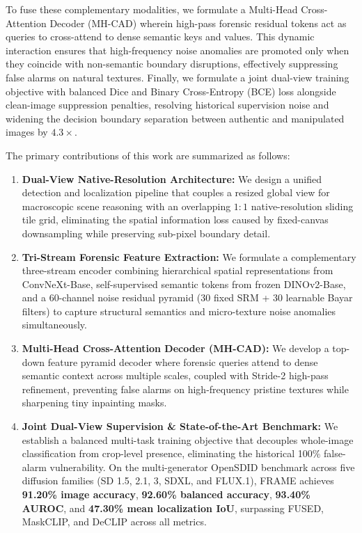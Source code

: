 To fuse these complementary modalities, we formulate a Multi-Head Cross-Attention Decoder (MH-CAD) wherein high-pass forensic residual tokens act as queries to cross-attend to dense semantic keys and values. This dynamic interaction ensures that high-frequency noise anomalies are promoted only when they coincide with non-semantic boundary disruptions, effectively suppressing false alarms on natural textures. Finally, we formulate a joint dual-view training objective with balanced Dice and Binary Cross-Entropy (BCE) loss alongside clean-image suppression penalties, resolving historical supervision noise and widening the decision boundary separation between authentic and manipulated images by $4.3\times$.

The primary contributions of this work are summarized as follows:
\begin{enumerate}
    \item \textbf{Dual-View Native-Resolution Architecture:} We design a unified detection and localization pipeline that couples a resized global view for macroscopic scene reasoning with an overlapping $1:1$ native-resolution sliding tile grid, eliminating the spatial information loss caused by fixed-canvas downsampling while preserving sub-pixel boundary detail.
    \item \textbf{Tri-Stream Forensic Feature Extraction:} We formulate a complementary three-stream encoder combining hierarchical spatial representations from ConvNeXt-Base, self-supervised semantic tokens from frozen DINOv2-Base, and a 60-channel noise residual pyramid (30 fixed SRM + 30 learnable Bayar filters) to capture structural semantics and micro-texture noise anomalies simultaneously.
    \item \textbf{Multi-Head Cross-Attention Decoder (MH-CAD):} We develop a top-down feature pyramid decoder where forensic queries attend to dense semantic context across multiple scales, coupled with Stride-2 high-pass refinement, preventing false alarms on high-frequency pristine textures while sharpening tiny inpainting masks.
    \item \textbf{Joint Dual-View Supervision \& State-of-the-Art Benchmark:} We establish a balanced multi-task training objective that decouples whole-image classification from crop-level presence, eliminating the historical 100\% false-alarm vulnerability. On the multi-generator OpenSDID benchmark across five diffusion families (SD 1.5, 2.1, 3, SDXL, and FLUX.1), FRAME achieves \textbf{91.20\% image accuracy}, \textbf{92.60\% balanced accuracy}, \textbf{93.40\% AUROC}, and \textbf{47.30\% mean localization IoU}, surpassing FUSED, MaskCLIP, and DeCLIP across all metrics.
\end{enumerate}
